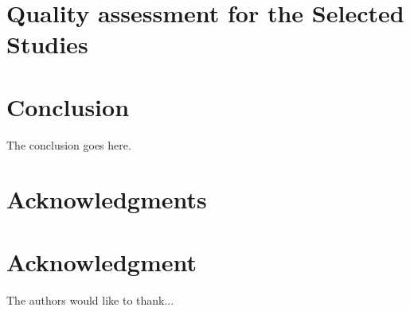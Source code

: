 \documentclass[conference,compsoc]{IEEEtran}
\begin{document}
\section{Quality assessment for the Selected Studies}





\section{Conclusion}
The conclusion goes here.







\ifCLASSOPTIONcompsoc
  \section*{Acknowledgments}
\else
  \section*{Acknowledgment}
\fi

The authors would like to thank...


\printbibliography


%
%
%
\end{document}
